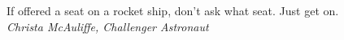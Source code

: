 \cleardoublepage
\thispagestyle{empty} %

\vspace*{8cm} 

\hfill
\begin{parbox}{0.7\textwidth}{
\begin{flushright}


If offered a seat on a rocket ship, don't ask what seat. Just get on. \\ \vspace{0.3cm} \textit{Christa McAuliffe, Challenger Astronaut}


\end{flushright}}
\end{parbox}


